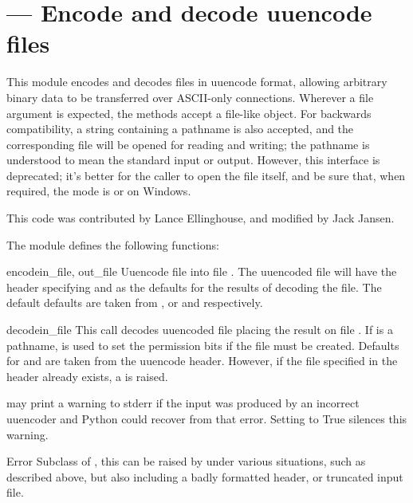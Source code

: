 \section{ ---
         Encode and decode uuencode files}



This module encodes and decodes files in uuencode format, allowing
arbitrary binary data to be transferred over ASCII-only connections.
Wherever a file argument is expected, the methods accept a file-like
object.  For backwards compatibility, a string containing a pathname
is also accepted, and the corresponding file will be opened for
reading and writing; the pathname  is understood to mean the
standard input or output.  However, this interface is deprecated; it's
better for the caller to open the file itself, and be sure that, when
required, the mode is  or  on Windows.

This code was contributed by Lance Ellinghouse, and modified by Jack
Jansen.

The  module defines the following functions:

\begin{funcdesc}{encode}{in_file, out_file}
  Uuencode file  into file .  The uuencoded
  file will have the header specifying  and  as
  the defaults for the results of decoding the file. The default
  defaults are taken from , or  and 
  respectively.
\end{funcdesc}

\begin{funcdesc}{decode}{in_file}
  This call decodes uuencoded file  placing the result on
  file . If  is a pathname,  is
  used to set the permission bits if the file must be
  created. Defaults for  and  are taken from
  the uuencode header.  However, if the file specified in the header
  already exists, a  is raised.

   may print a warning to stderr if the input was produced 
  by an incorrect uuencoder and Python could recover from that error.
  Setting  to True silences this warning.
\end{funcdesc}

\begin{excclassdesc}{Error}{}
  Subclass of , this can be raised by
   under various situations, such as described
  above, but also including a badly formatted header, or truncated
  input file.
\end{excclassdesc}

\begin{seealso}
\end{seealso}
